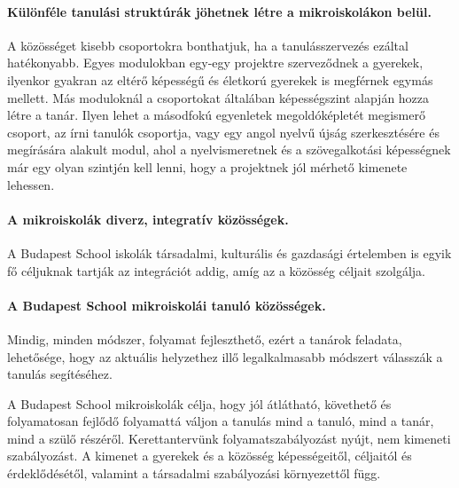 \paragraph{Különféle tanulási struktúrák jöhetnek létre a mikroiskolákon
  belül.}

A közösséget kisebb csoportokra bonthatjuk, ha a tanulásszervezés ezáltal
hatékonyabb. Egyes modulokban egy-egy projektre szerveződnek a gyerekek,
ilyenkor gyakran az eltérő képességű és életkorú gyerekek is megférnek
egymás
mellett. Más moduloknál a csoportokat általában képességszint alapján hozza
létre a tanár. Ilyen lehet a másodfokú egyenletek megoldóképletét megismerő
csoport, az írni tanulók csoportja, vagy egy angol nyelvű újság
szerkesztésére
és megírására alakult modul, ahol a nyelvismeretnek és a szövegalkotási
képességnek már egy olyan szintjén kell lenni, hogy a projektnek jól
mérhető
kimenete lehessen.

\paragraph{A mikroiskolák diverz, integratív közösségek.} A Budapest School
iskolák társadalmi,
kulturális és gazdasági értelemben is egyik fő céljuknak tartják az
integrációt addig,
amíg az a közösség céljait szolgálja.

\paragraph{A Budapest School mikroiskolái tanuló közösségek.} Mindig, minden
módszer,
folyamat fejleszthető, ezért a tanárok feladata, lehetősége, hogy az aktuális
helyzethez illő legalkalmasabb módszert válasszák a tanulás segítéséhez.

A Budapest School mikroiskolák célja, hogy jól átlátható, követhető és
folyamatosan fejlődő folyamattá váljon a tanulás mind a tanuló, mind a tanár,
mind
a szülő részéről. Kerettantervünk folyamatszabályozást nyújt, nem kimeneti
szabályozást. A kimenet a gyerekek és a közösség képességeitől, céljaitól és
érdeklődésétől,
valamint a társadalmi szabályozási környezettől függ.

\ifkerettanterv
  
\fi
